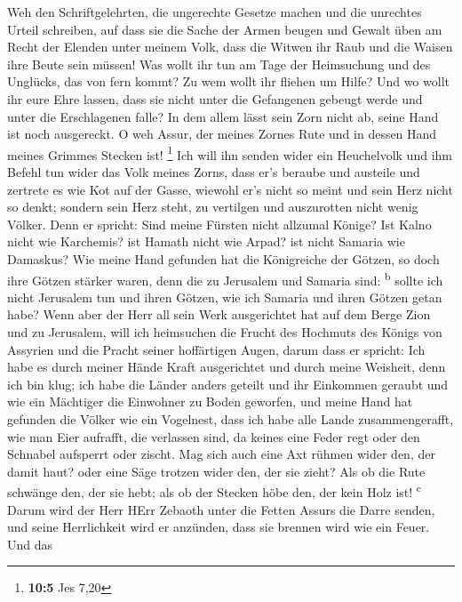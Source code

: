  Weh den Schriftgelehrten, die ungerechte Gesetze machen
und die unrechtes Urteil schreiben,  auf dass sie die
Sache der Armen beugen und Gewalt üben am Recht der Elenden unter meinem
Volk, dass die Witwen ihr Raub und die Waisen ihre Beute sein müssen!
 Was wollt ihr tun am Tage der Heimsuchung und des
Unglücks, das von fern kommt? Zu wem wollt ihr fliehen um Hilfe? Und wo
wollt ihr eure Ehre lassen,  dass sie nicht unter die
Gefangenen gebeugt werde und unter die Erschlagenen falle? In dem allem
lässt sein Zorn nicht ab, seine Hand ist noch ausgereckt. 
O weh Assur, der meines Zornes Rute und in dessen Hand meines Grimmes
Stecken ist! \footnote{\textbf{10:5} Jes 7,20}  Ich will
ihn senden wider ein Heuchelvolk und ihm Befehl tun wider das Volk
meines Zorns, dass er's beraube und austeile und zertrete es wie Kot auf
der Gasse,  wiewohl er's nicht so meint und sein Herz
nicht so denkt; sondern sein Herz steht, zu vertilgen und auszurotten
nicht wenig Völker.  Denn er spricht: Sind meine Fürsten
nicht allzumal Könige?  Ist Kalno nicht wie Karchemis? ist
Hamath nicht wie Arpad? ist nicht Samaria wie Damaskus? 
Wie meine Hand gefunden hat die Königreiche der Götzen, so doch ihre
Götzen stärker waren, denn die zu Jerusalem und Samaria sind:
\textsuperscript{b}  sollte ich nicht Jerusalem tun und
ihren Götzen, wie ich Samaria und ihren Götzen getan habe?
 Wenn aber der Herr all sein Werk ausgerichtet hat auf
dem Berge Zion und zu Jerusalem, will ich heimsuchen die Frucht des
Hochmuts des Königs von Assyrien und die Pracht seiner hoffärtigen
Augen,  darum dass er spricht: Ich habe es durch meiner
Hände Kraft ausgerichtet und durch meine Weisheit, denn ich bin klug;
ich habe die Länder anders geteilt und ihr Einkommen geraubt und wie ein
Mächtiger die Einwohner zu Boden geworfen,  und meine
Hand hat gefunden die Völker wie ein Vogelnest, dass ich habe alle Lande
zusammengerafft, wie man Eier aufrafft, die verlassen sind, da keines
eine Feder regt oder den Schnabel aufsperrt oder zischt. 
Mag sich auch eine Axt rühmen wider den, der damit haut? oder eine Säge
trotzen wider den, der sie zieht? Als ob die Rute schwänge den, der sie
hebt; als ob der Stecken höbe den, der kein Holz ist!
\textsuperscript{c}  Darum wird der Herr HErr Zebaoth
unter die Fetten Assurs die Darre senden, und seine Herrlichkeit wird er
anzünden, dass sie brennen wird wie ein Feuer.  Und das
